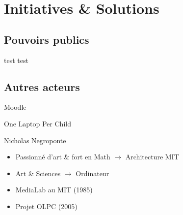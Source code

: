 \section{Initiatives \& Solutions}

\subsection{Pouvoirs publics}

\begin{frame}{test}
test
\end{frame}

\subsection{Autres acteurs}

\begin{frame}{Moodle}
\end{frame}

\begin{frame}{One Laptop Per Child}
  \begin{block}{Nicholas Negroponte}
    \begin{itemize}
      \item Passionné d'art \& fort en Math $\rightarrow$ Architecture MIT
      \item Art \& Sciences $\rightarrow$ Ordinateur
      \item MediaLab au MIT (1985)
      \item Projet OLPC (2005)
    \end{itemize}
  \end{block}
\end{frame}

